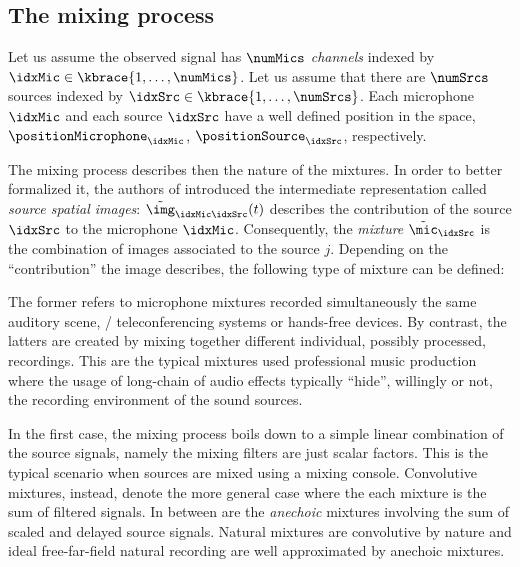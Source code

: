 \subsection{The mixing process}
Let us assume the observed signal has $\numMics$ \textit{channels} indexed by $\idxMic \in \kbrace{1,\dots,\numMics}$.
Let us assume that there are $\numSrcs$ sources indexed by $\idxSrc \in \kbrace{1,\dots,\numSrcs}$.
Each microphone $\idxMic$ and each source $\idxSrc$ have a well defined position in the space, $\positionMicrophone_\idxMic$, $\positionSource_\idxSrc$, respectively.

The mixing process describes then the nature of the mixtures.
In order to better formalized it, the authors of  introduced the intermediate representation called \emph{source spatial images}:
$\tilde{\img}_{\idxMic\idxSrc}(t)$ describes the contribution of the source $\idxSrc$ to the microphone $\idxMic$.
Consequently, the \textit{mixture} $\tilde{\mic}_{\idxSrc}$ is the combination of images associated to the source $j$.
Depending on the ``contribution'' the image describes, the following type of mixture can be defined:

The former refers to microphone mixtures recorded simultaneously the same auditory scene, \eg/ teleconferencing systems or hands-free devices.
By contrast, the latters are created by mixing together different individual, possibly processed, recordings.
This are the typical mixtures used professional music production where the usage of long-chain of audio effects typically ``hide'', willingly or not, the recording environment of the sound sources.

In the first case, the mixing process boils down to a simple linear combination of the source signals, namely
the mixing filters are just scalar factors.
This is the typical scenario when sources are mixed using a mixing console.
Convolutive mixtures, instead, denote the more general case where the each mixture is the sum of filtered signals.
In between are the \textit{anechoic} mixtures involving the sum of scaled and delayed source signals.
Natural mixtures are convolutive by nature and ideal free-far-field natural recording are well approximated by anechoic mixtures.

